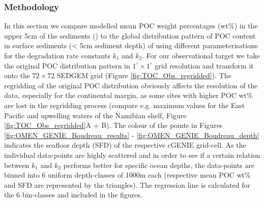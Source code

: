 \documentclass[gmd, manuscript]{copernicus}
\begin{document}
\subsubsection{Methodology}
In this section we compare modelled mean POC weight percentages (wt\%) in the upper 5cm of the sediments  () to the global distribution pattern of POC content in surface sediments 
(< 5cm sediment depth) of \citet{seiter_organic_2004} using different parameterisations for the degradation rate constants $k_1$ and $k_2$. 
For our observational target we take the original POC distribution pattern in $1^\circ \times 1^\circ$ grid resolution \citep[interpolated from > 5500 measurements, compare][]{seiter_organic_2004} and transform it onto the $72\times 72$ SEDGEM grid 
(Figure \ref{fig:TOC_Obs_regridded}). The regridding of the original POC distribution obviously affects the resolution of the data, especially for the continental margin, as some sites with higher POC wt\% are lost in the 
regridding process (compare e.g. maximum values for the East Pacific and upwelling waters of the Namibian shelf, Figure \ref{fig:TOC_Obs_regridded}A + B). 
The colour of the points in Figures \ref{fig:OMEN_GENIE_Boudreau_results} - \ref{fig:OMEN_GENIE_Boudreau_depth} %
indicates the seafloor depth (SFD) of the respective cGENIE grid-cell. 
As the individual data-points are highly scattered and 
in order to see if a certain relation between $k_1$ and $k_2$ performs better for specific ocean depths, the data-points are binned into 6 uniform depth-classes of 1000m each (respective mean POC wt\% and SFD are represented by 
the triangles). The regression line is calculated for the 6 bin-classes and included in the figures.
\end{document}
